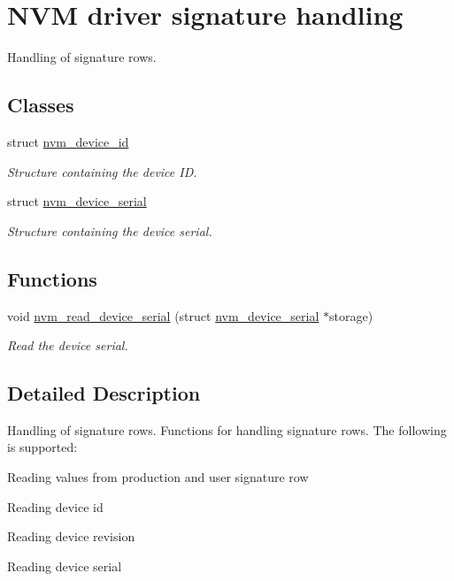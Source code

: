 \hypertarget{group__nvm__signature__group}{\section{N\-V\-M driver signature handling}
\label{group__nvm__signature__group}
}


Handling of signature rows.  


\subsection*{Classes}
\begin{DoxyCompactItemize}
\item 
struct \hyperlink{structnvm__device__id}{nvm\-\_\-device\-\_\-id}
\begin{DoxyCompactList}\small\item\em Structure containing the device I\-D. \end{DoxyCompactList}\item 
struct \hyperlink{structnvm__device__serial}{nvm\-\_\-device\-\_\-serial}
\begin{DoxyCompactList}\small\item\em Structure containing the device serial. \end{DoxyCompactList}\end{DoxyCompactItemize}
\subsection*{Functions}
\begin{DoxyCompactItemize}
\item 
void \hyperlink{group__nvm__signature__group_ga38a7855d9e84c9cc7974552583854c81}{nvm\-\_\-read\-\_\-device\-\_\-serial} (struct \hyperlink{structnvm__device__serial}{nvm\-\_\-device\-\_\-serial} $\ast$storage)
\begin{DoxyCompactList}\small\item\em Read the device serial. \end{DoxyCompactList}\end{DoxyCompactItemize}


\subsection{Detailed Description}
Handling of signature rows. Functions for handling signature rows. The following is supported\-:
\begin{DoxyItemize}
\item Reading values from production and user signature row
\item Reading device id
\item Reading device revision
\item Reading device serial
\end{DoxyItemize}

